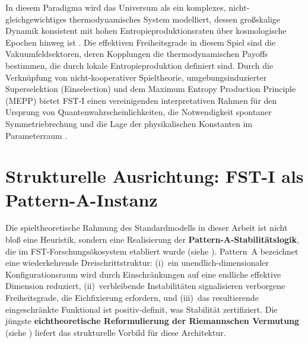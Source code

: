 \documentclass[12pt,a4paper]{article}
\theoremstyle{remark}
\begin{document}
In diesem Paradigma wird das Universum als ein komplexes, nicht-gleichgewichtiges thermodynamisches System modelliert, dessen gro\ss{}skalige Dynamik konsistent mit hohen Entropieproduktionsraten \"uber kosmologische Epochen hinweg ist \citep{MEPP2004}. Die effektiven Freiheitsgrade in diesem Spiel sind die Vakuumfeldsektoren, deren Kopplungen die thermodynamischen Payoffs bestimmen, die durch lokale Entropieproduktion definiert sind. Durch die Verkn\"upfung von nicht-kooperativer Spieltheorie, umgebungsinduzierter Superselektion (Einselection) und dem Maximum Entropy Production Principle (MEPP) bietet FST-I einen vereinigenden interpretativen Rahmen f\"ur den Ursprung von Quantenwahrscheinlichkeiten, die Notwendigkeit spontaner Symmetriebrechung und die Lage der physikalischen Konstanten im Parameterraum \citep{QuantumOptimization,LasryLions2007,HiggsVEV2024}.

\section{Strukturelle Ausrichtung: FST-I als Pattern-A-Instanz}
\label{sec:structural-alignment}

Die spieltheoretische Rahmung des Standardmodells in dieser Arbeit ist nicht blo\ss{} eine Heuristik, sondern eine Realisierung der \textbf{Pattern-A-Stabilit\"atslogik}, die im FST-Forschungs\"okosystem etabliert wurde (siehe \cite{FST-Unified2026}). Pattern~A bezeichnet eine wiederkehrende Dreischrittstruktur: (i)~ein unendlich-dimensionaler Konfigurationsraum wird durch Einschr\"ankungen auf eine endliche effektive Dimension reduziert, (ii)~verbleibende Instabilit\"aten signalisieren verborgene Freiheitsgrade, die Eichfixierung erfordern, und (iii)~das resultierende eingeschr\"ankte Funktional ist positiv-definit, was Stabilit\"at zertifiziert. Die j\"ungste \textbf{eichtheoretische Reformulierung der Riemannschen Vermutung} (siehe \cite{GeigerRH2026c}) liefert das strukturelle Vorbild f\"ur diese Architektur.
\end{document}
